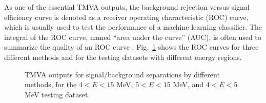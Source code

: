 As one of the essential TMVA outputs, the background rejection versus signal efficiency curve is denoted as a receiver operating characteristic (ROC) curve, which is usually used to test the performance of a machine learning classifier. The integral of the ROC curve, named ``area under the curve'' (AUC), is often used to summarize the quality of an ROC curve \cite{murphy2012machine}.  Fig.~\ref{fig:energyVsROC} shows the ROC curves for three different methods and for the testing datasets with different energy regions.

\begin{figure}[htbp]
	\centering
	\caption[TMVA outputs for signal/background separations by different methods]{TMVA outputs for signal/background separations by different methods, for the $4<E<15$ MeV, $5<E<15$ MeV, and $4<E<5$ MeV testing dataset.\label{fig:energyVsROC}}
\end{figure}

